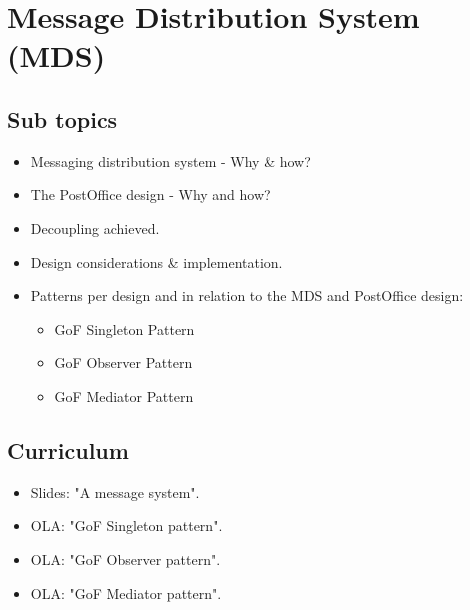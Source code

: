 \section{Message Distribution System (MDS)}

\subsection{Sub topics}

\begin{itemize}
	\item Messaging distribution system - Why & how?
	\item The PostOffice design - Why and how?
	\item Decoupling achieved.
	\item Design considerations & implementation.
	\item Patterns per design and in relation to the MDS and PostOffice design:
	\begin{itemize}
		\item GoF Singleton Pattern
		\item GoF Observer Pattern
		\item GoF Mediator Pattern
	\end{itemize}
\end{itemize}

\subsection{Curriculum}

\begin{itemize}
	\item Slides: "A message system".
	\item OLA: "GoF Singleton pattern".
	\item OLA: "GoF Observer pattern".
	\item OLA: "GoF Mediator pattern".
\end{itemize}